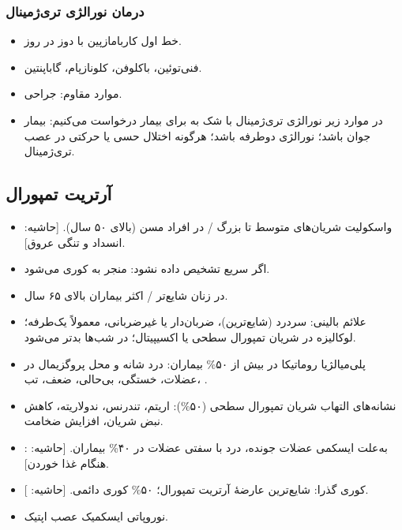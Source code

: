\subsubsection{درمان نورالژی تری‌ژمینال}
\begin{itemize}
\item خط اول کاربامازپین با دوز  در روز.
\item فنی‌توئین، باکلوفن، کلونازپام، گاباپنتین.
\item موارد مقاوم: جراحی.
\item در موارد زیر نورالژی تری‌ژمینال با شک به  برای بیمار  درخواست می‌کنیم: بیمار جوان باشد؛ نورالژی دوطرفه باشد؛ هرگونه اختلال حسی یا حرکتی در عصب تری‌ژمینال.
\end{itemize}
\subsection{آرتریت تمپورال}
\begin{itemize}
\item واسکولیت شریان‌های متوسط تا بزرگ / در افراد مسن (بالای ۵۰ سال). [حاشیه: انسداد و تنگی عروق].
\item اگر سریع تشخیص داده نشود: منجر به کوری می‌شود.
\item در زنان شایع‌تر / اکثر بیماران بالای ۶۵ سال.
\item علائم بالینی: سردرد (شایع‌ترین)، ضربان‌دار یا غیرضربانی، معمولاً یک‌طرفه؛ لوکالیزه در شریان تمپورال سطحی یا اکسیپیتال؛ در شب‌ها بدتر می‌شود.
\item پلی‌میالژیا روماتیکا در بیش از ۵۰\% بیماران: درد شانه و محل پروگزیمال در عضلات، خستگی، بی‌حالی، ضعف، تب، .
\item نشانه‌های التهاب شریان تمپورال سطحی (۵۰\%): اریتم، تندرنس، ندولاریته، کاهش نبض شریان، افزایش ضخامت.
\item {}: به‌علت ایسکمی عضلات جونده، درد با سفتی عضلات در ۴۰\% بیماران. [حاشیه: هنگام غذا خوردن].
\item کوری گذرا: شایع‌ترین عارضهٔ آرتریت تمپورال؛ ۵۰\% کوری دائمی. [حاشیه: ].
\item نوروپاتی ایسکمیک عصب اپتیک.
\end{itemize}


